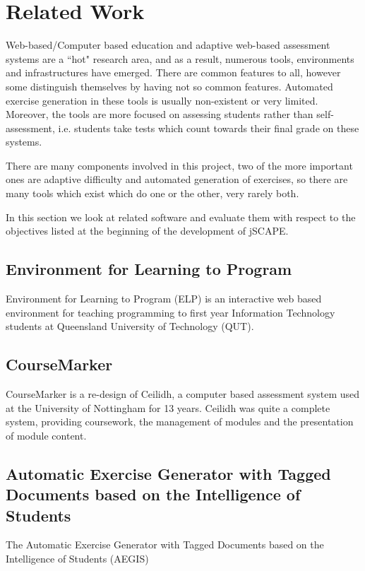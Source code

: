 \chapter{Related Work}

Web-based/Computer based education and adaptive web-based assessment systems are a ``hot" research area, and as a result, numerous tools, environments and infrastructures have emerged. There are common features to all, however some distinguish themselves by having not so common features.
Automated exercise generation in these tools is usually non-existent or very limited. Moreover, the tools are more focused on assessing students rather than self-assessment, i.e. students take tests which count towards their final grade on these systems.\newline

There are many components involved in this project, two of the more important ones are adaptive difficulty and automated generation of exercises, so there are many tools which exist which do one or the other, very rarely both.\newline

In this section we look at related software and evaluate them with respect to the objectives listed at the beginning of the development of jSCAPE.

\section{Environment for Learning to Program}
Environment for Learning to Program (ELP) is an interactive web based environment for teaching programming to first year Information Technology students at Queensland University of Technology (QUT).

\section{CourseMarker}
CourseMarker is a re-design of Ceilidh, a computer based assessment system used at the University of Nottingham for 13 years. Ceilidh was quite a complete system, providing coursework, the management of modules and the presentation of module content.

\section{Automatic Exercise Generator with Tagged Documents based on the Intelligence of Students}
The Automatic Exercise Generator with Tagged Documents based on the Intelligence of Students (AEGIS)

